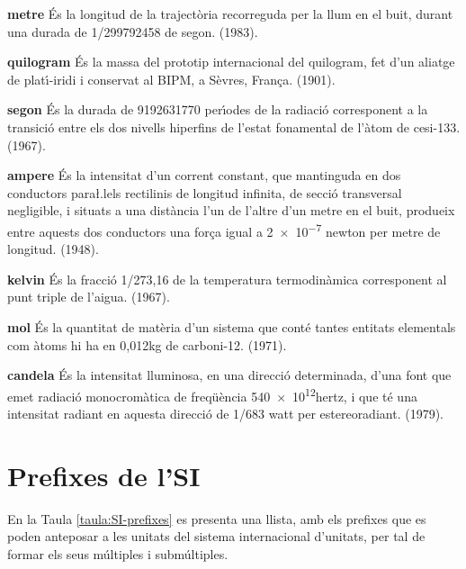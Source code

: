 \begin{list}{}
   {\setlength{\labelwidth}{22mm} \setlength{\leftmargin}{22mm} \setlength{\labelsep}{2mm}}
   \item[\textbf{metre}] \'{E}s la longitud de la traject\`{o}ria recorreguda per la llum
   en el buit, durant una durada de 1/\num{299792458} de segon. (1983).
   \item[\textbf{quilogram}] \'{E}s la massa del prototip internacional del quilogram, fet d'un aliatge de plat\'{\i}-iridi i
    conservat al \textsf{BIPM}, a S\`{e}vres, Fran\c{c}a. (1901).
   \item[\textbf{segon}] \'{E}s la durada de \num{9192631770} per\'{\i}odes de la
   radiaci\'{o} corresponent a la transici\'{o} entre els dos nivells
  hiperfins de l'estat fonamental de l'\`{a}tom de cesi-133. (1967).
   \item[\textbf{ampere}] \'{E}s la intensitat d'un corrent constant,
   que mantinguda en dos conductors para{\l.l}els rectilinis de longitud
   infinita, de secci\'{o} transversal negligible, i situats a una
   dist\`{a}ncia l'un de l'altre d'un metre en el buit, produeix entre
   aquests dos conductors  una for\c{c}a igual a \num{2e-7} newton per metre de longitud. (1948).
   \item[\textbf{kelvin}] \'{E}s la fracci\'{o} 1/273,16 de la temperatura
   termodin\`{a}mica corresponent al punt triple de l'aigua. (1967).
   \item[\textbf{mol}] \'{E}s la quantitat de mat\`{e}ria d'un sistema que cont\'{e} tantes
   entitats elementals com \`{a}toms hi ha en 0,012\unit{kg} de carboni-12. (1971).
   \item[\textbf{candela}] \'{E}s la intensitat lluminosa, en una direcci\'{o} determinada,
   d'una font que emet radiaci\'{o} monocrom\`{a}tica de freq\"{u}\`{e}ncia \num{540e12}\unit{hertz}, i
   que t\'{e} una intensitat radiant en aquesta direcci\'{o} de 1/683 watt per estereoradiant. (1979).
\end{list}


\section{Prefixes de l'SI}

En la Taula \vref{taula:SI-prefixes} es presenta una llista, amb els
prefixes que es poden anteposar a les unitats del sistema
internacional d'unitats, per tal de formar els seus m\'{u}ltiples i
subm\'{u}ltiples.


